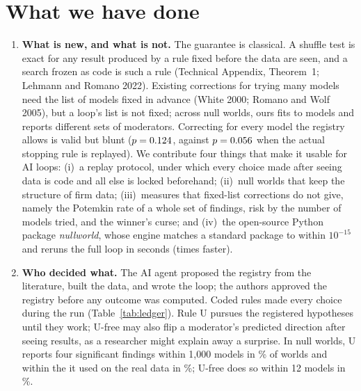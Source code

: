 \documentclass[11pt]{article}
\begin{document}
\section*{What we have done}
\begin{enumerate}
\item \textbf{What is new, and what is not.} The guarantee is classical. A shuffle test is exact for any result produced by
a rule fixed before the data are seen, and a search frozen as code is such a rule (Technical Appendix, Theorem~1; Lehmann
and Romano 2022). Existing corrections for trying many models need the list of models fixed in advance (White 2000;
Romano and Wolf 2005), but a loop's list is not fixed; across null worlds, ours fits \VModelsMin to \VModelsMax models and
reports \VTriples different sets of moderators. Correcting for every model the registry allows is valid but blunt
($p=0.124$, against $p=0.056$ when the actual stopping rule is replayed). We contribute four things that
make it usable for AI loops: (i)~a replay protocol, under which every choice made after seeing data is code and all else
is locked beforehand; (ii)~null worlds that keep the structure of firm data; (iii)~measures that fixed-list corrections
do not give, namely the Potemkin rate of a whole set of findings, risk by the number of models tried, and the winner's
curse; and (iv)~the open-source Python package \emph{nullworld}, whose engine matches a standard package to
within $10^{-15}$ and reruns the full loop in \VSecWorld seconds (\VSpeedup times faster).

\item \textbf{Who decided what.} The AI agent proposed the registry from the literature, built the data, and wrote the loop; the authors
approved the registry before any outcome was computed. Coded rules made every choice during the run (Table~\ref{tab:ledger}). Rule U pursues the registered hypotheses until they work; U-free may also flip a moderator's
predicted direction after seeing results, as a researcher might explain away a surprise. In null worlds, U reports four significant
findings within 1,000 models in \VBudUThousand\% of worlds and within the \ModelsToFirstU it used on the real data in
\VBudUReal\%; U-free does so within 12 models in \VBudFreeTwelve\%.


\end{enumerate}
\end{document}
